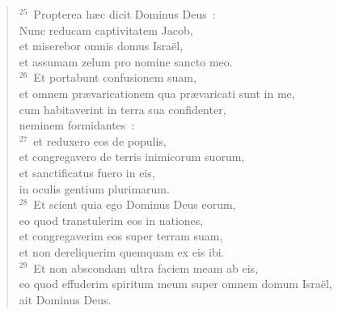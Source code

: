 \begin{flushleft}\begin{verse}${}^{25}$~Propterea h\ae c dicit Dominus Deus~:\\ Nunc reducam captivitatem Jacob,\\ et miserebor omnis domus Isra\"el,\\ et assumam zelum pro nomine sancto meo.\\
${}^{26}$~Et portabunt confusionem suam,\\ et omnem pr\ae varicationem qua pr\ae varicati sunt in me,\\ cum habitaverint in terra sua confidenter,\\ neminem formidantes~:\\
${}^{27}$~et reduxero eos de populis,\\ et congregavero de terris inimicorum suorum,\\ et sanctificatus fuero in eis,\\ in oculis gentium plurimarum.\\
${}^{28}$~Et scient quia ego Dominus Deus eorum,\\ eo quod transtulerim eos in nationes,\\ et congregaverim eos super terram suam,\\ et non dereliquerim quemquam ex eis ibi.\\
${}^{29}$~Et non abscondam ultra faciem meam ab eis,\\ eo quod effuderim spiritum meum super omnem domum Isra\"el,\\ ait Dominus Deus.\end{verse}\end{flushleft}



